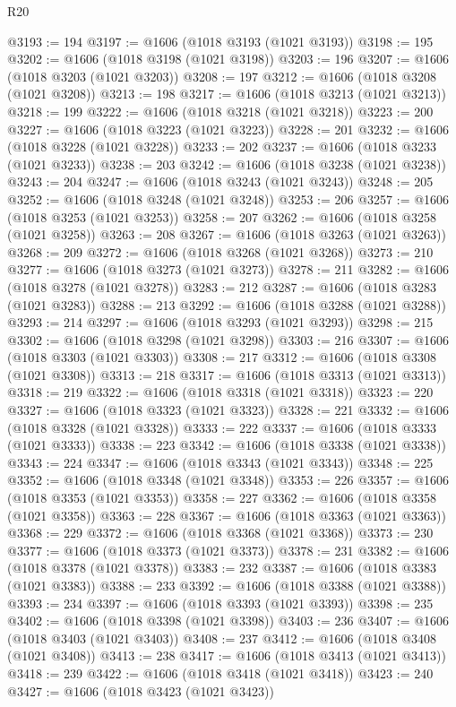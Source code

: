 \begin{lexlean}{R20}
\begin{coremodule}
@3193 := 194
@3197 := @1606 (@1018 @3193 (@1021 @3193))
@3198 := 195
@3202 := @1606 (@1018 @3198 (@1021 @3198))
@3203 := 196
@3207 := @1606 (@1018 @3203 (@1021 @3203))
@3208 := 197
@3212 := @1606 (@1018 @3208 (@1021 @3208))
@3213 := 198
@3217 := @1606 (@1018 @3213 (@1021 @3213))
@3218 := 199
@3222 := @1606 (@1018 @3218 (@1021 @3218))
@3223 := 200
@3227 := @1606 (@1018 @3223 (@1021 @3223))
@3228 := 201
@3232 := @1606 (@1018 @3228 (@1021 @3228))
@3233 := 202
@3237 := @1606 (@1018 @3233 (@1021 @3233))
@3238 := 203
@3242 := @1606 (@1018 @3238 (@1021 @3238))
@3243 := 204
@3247 := @1606 (@1018 @3243 (@1021 @3243))
@3248 := 205
@3252 := @1606 (@1018 @3248 (@1021 @3248))
@3253 := 206
@3257 := @1606 (@1018 @3253 (@1021 @3253))
@3258 := 207
@3262 := @1606 (@1018 @3258 (@1021 @3258))
@3263 := 208
@3267 := @1606 (@1018 @3263 (@1021 @3263))
@3268 := 209
@3272 := @1606 (@1018 @3268 (@1021 @3268))
@3273 := 210
@3277 := @1606 (@1018 @3273 (@1021 @3273))
@3278 := 211
@3282 := @1606 (@1018 @3278 (@1021 @3278))
@3283 := 212
@3287 := @1606 (@1018 @3283 (@1021 @3283))
@3288 := 213
@3292 := @1606 (@1018 @3288 (@1021 @3288))
@3293 := 214
@3297 := @1606 (@1018 @3293 (@1021 @3293))
@3298 := 215
@3302 := @1606 (@1018 @3298 (@1021 @3298))
@3303 := 216
@3307 := @1606 (@1018 @3303 (@1021 @3303))
@3308 := 217
@3312 := @1606 (@1018 @3308 (@1021 @3308))
@3313 := 218
@3317 := @1606 (@1018 @3313 (@1021 @3313))
@3318 := 219
@3322 := @1606 (@1018 @3318 (@1021 @3318))
@3323 := 220
@3327 := @1606 (@1018 @3323 (@1021 @3323))
@3328 := 221
@3332 := @1606 (@1018 @3328 (@1021 @3328))
@3333 := 222
@3337 := @1606 (@1018 @3333 (@1021 @3333))
@3338 := 223
@3342 := @1606 (@1018 @3338 (@1021 @3338))
@3343 := 224
@3347 := @1606 (@1018 @3343 (@1021 @3343))
@3348 := 225
@3352 := @1606 (@1018 @3348 (@1021 @3348))
@3353 := 226
@3357 := @1606 (@1018 @3353 (@1021 @3353))
@3358 := 227
@3362 := @1606 (@1018 @3358 (@1021 @3358))
@3363 := 228
@3367 := @1606 (@1018 @3363 (@1021 @3363))
@3368 := 229
@3372 := @1606 (@1018 @3368 (@1021 @3368))
@3373 := 230
@3377 := @1606 (@1018 @3373 (@1021 @3373))
@3378 := 231
@3382 := @1606 (@1018 @3378 (@1021 @3378))
@3383 := 232
@3387 := @1606 (@1018 @3383 (@1021 @3383))
@3388 := 233
@3392 := @1606 (@1018 @3388 (@1021 @3388))
@3393 := 234
@3397 := @1606 (@1018 @3393 (@1021 @3393))
@3398 := 235
@3402 := @1606 (@1018 @3398 (@1021 @3398))
@3403 := 236
@3407 := @1606 (@1018 @3403 (@1021 @3403))
@3408 := 237
@3412 := @1606 (@1018 @3408 (@1021 @3408))
@3413 := 238
@3417 := @1606 (@1018 @3413 (@1021 @3413))
@3418 := 239
@3422 := @1606 (@1018 @3418 (@1021 @3418))
@3423 := 240
@3427 := @1606 (@1018 @3423 (@1021 @3423))

\end{coremodule}
\end{lexlean}
